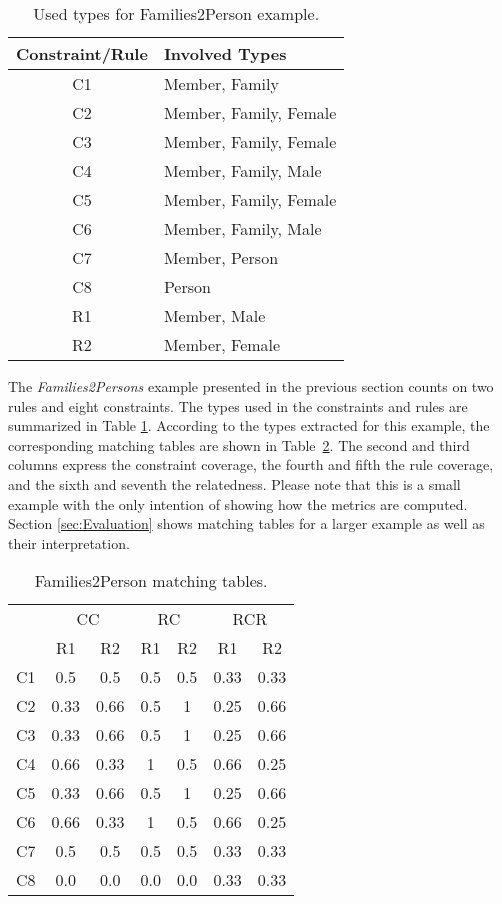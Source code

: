 \begin{table}[t]
\centering
\caption{Used types for Families2Person example.}
\begin{tabular}{|c|l|} \hline
Constraint/Rule&Involved Types\\ \hline
C1&Member, Family\\ \hline
C2&Member, Family, Female\\ \hline
C3&Member, Family, Female\\ \hline
C4&Member, Family, Male\\ \hline
C5&Member, Family, Female\\ \hline
C6&Member, Family, Male\\ \hline
C7&Member, Person\\ \hline
C8&Person\\ \hline
R1&Member, Male\\ \hline
R2&Member, Female\\ \hline
\end{tabular}
\label{tab:Family2PersonExample}
\end{table}

The \emph{Families2Persons} example presented in the previous section counts on two rules and eight constraints. The types used in the constraints and rules are summarized in Table \ref{tab:Family2PersonExample}.
According to the types extracted for this example, the corresponding matching tables are shown in Table~\ref{tab:TableSM2LUT}. The second and third columns express the constraint coverage, the fourth and fifth the rule coverage, and the sixth and seventh the relatedness. Please note that this is a small example with the only intention of showing how the metrics are computed. Section \ref{sec:Evaluation} shows matching tables for a larger example as well as their interpretation.

\begin{table}[t]
\centering
\caption{Families2Person matching tables.}
\begin{tabular}{c|c|c||c|c||c|c|}
\cline{2-7}
& \multicolumn{2}{|c||}{CC} & \multicolumn{2}{|c||}{RC} & \multicolumn{2}{|c|}{RCR}\\ \cline{2-7}
&R1&R2&R1&R2&R1&R2\\ \hline
\multicolumn{1}{|c|}{C1}&0.5&0.5&0.5&0.5&0.33&0.33\\ \hline
\multicolumn{1}{|c|}{C2}&0.33&0.66&0.5&1&0.25&0.66\\ \hline
\multicolumn{1}{|c|}{C3}&0.33&0.66&0.5&1&0.25&0.66\\ \hline
\multicolumn{1}{|c|}{C4}&0.66&0.33&1&0.5&0.66&0.25\\ \hline
\multicolumn{1}{|c|}{C5}&0.33&0.66&0.5&1&0.25&0.66\\ \hline
\multicolumn{1}{|c|}{C6}&0.66&0.33&1&0.5&0.66&0.25\\ \hline
\multicolumn{1}{|c|}{C7}&0.5&0.5&0.5&0.5&0.33&0.33\\ \hline
\multicolumn{1}{|c|}{C8}&0.0&0.0&0.0&0.0&0.33&0.33\\ \hline
\end{tabular}
\label{tab:TableSM2LUT}
\end{table}



